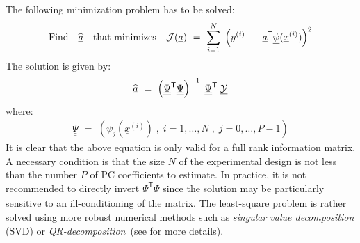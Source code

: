 {  The following minimization problem has to be solved:
  \begin{align*}
    \mbox{Find} \quad \widehat{\underline{a}} \quad \mbox{that minimizes} \quad {\mathcal J}(\underline{a}) \, \, = \, \, \sum_{i=1}^N \; \left( y^{(i)} \; - \; \underline{a}^{\textsf{T}}  \underline{\psi}(\underline{x}^{(i)}) \right)^2
  \end{align*}
  The solution is given by:
  \begin{align*}
    \widehat{\underline{a}} \, \, = \, \, \left( \underline{\underline{\Psi}}^{\textsf{T}} \underline{\underline{\Psi}}  \right)^{-1} \; \underline{\underline{\Psi}}^{\textsf{T}}  \; \underline{{\mathcal Y}}
  \end{align*}
  where:
  \begin{align*}
    \underline{\underline{\Psi}} \, \, = \, \, (\psi_{j}(\underline{x}^{(i)}) \; , \; i=1,\dots,N \; , \; j = 0,\dots,P-1)
  \end{align*}
  It is clear that the above equation is only valid for a full rank information matrix. A necessary condition is that the size $N$ of the experimental design is not less than the number $P$ of PC coefficients to estimate. In practice, it is not recommended to directly invert $\underline{\underline{\Psi}}^{\textsf{T}} \underline{\underline{\Psi}}$ since the solution may be particularly sensitive to an ill-conditioning of the matrix. The least-square problem is rather solved using more robust numerical methods such as \emph{singular value decomposition} (SVD) or \emph{QR-decomposition}~(see  for more details). \\

}
{
}


